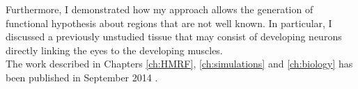 Furthermore, I demonstrated how my approach allows the generation of functional hypothesis about regions that are not well known. In particular, I discussed a previously unstudied tissue that may consist of developing neurons directly linking the eyes to the developing muscles.\\

The work described in Chapters \ref{ch:HMRF}, \ref{ch:simulations} and \ref{ch:biology} has been published in September 2014 \cite{pettit14}.

